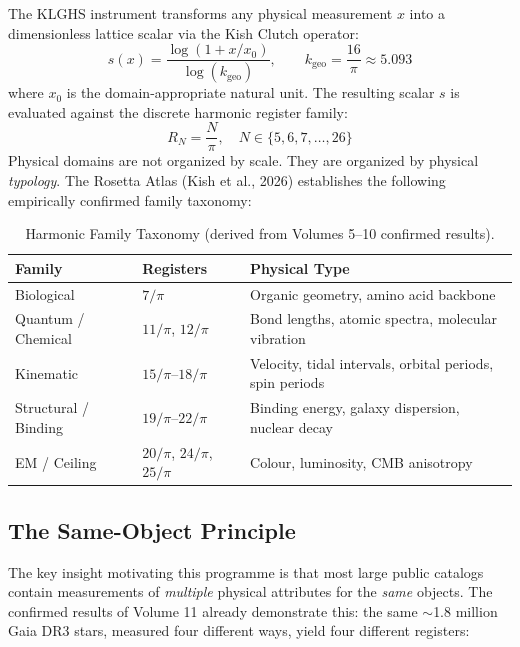 \documentclass[12pt,a4paper]{article}
\newcommand{\kgeo}{\ensuremath{k_{\mathrm{geo}}}}
\begin{document}
The KLGHS instrument transforms any physical measurement $x$ into a
dimensionless lattice scalar via the Kish Clutch operator:
\begin{equation}
  s(x) = \frac{\log(1 + x/x_0)}{\log(\kgeo)},
  \qquad \kgeo = \frac{16}{\pi} \approx 5.093
  \label{eq:kish_clutch}
\end{equation}
where $x_0$ is the domain-appropriate natural unit. The resulting scalar $s$ is
evaluated against the discrete harmonic register family:
\begin{equation}
  R_N = \frac{N}{\pi}, \quad N \in \{5, 6, 7, \ldots, 26\}
\end{equation}
Physical domains are not organized by scale. They are organized by physical
\emph{typology}. The Rosetta Atlas (Kish et al., 2026) establishes the
following empirically confirmed family taxonomy:

\begin{table}[h!]
\centering
\caption{Harmonic Family Taxonomy (derived from Volumes 5--10 confirmed results).}
\label{tab:rosetta_families}
\begin{tabular}{lll}
\toprule
\textbf{Family} & \textbf{Registers} & \textbf{Physical Type} \\
\midrule
Biological & $7/\pi$ & Organic geometry, amino acid backbone \\
Quantum / Chemical & $11/\pi$, $12/\pi$ & Bond lengths, atomic spectra, molecular vibration \\
Kinematic & $15/\pi$--$18/\pi$ & Velocity, tidal intervals, orbital periods, spin periods \\
Structural / Binding & $19/\pi$--$22/\pi$ & Binding energy, galaxy dispersion, nuclear decay \\
EM / Ceiling & $20/\pi$, $24/\pi$, $25/\pi$ & Colour, luminosity, CMB anisotropy \\
\bottomrule
\end{tabular}
\end{table}

\subsection{The Same-Object Principle}

The key insight motivating this programme is that most large public catalogs
contain measurements of \emph{multiple} physical attributes for the
\emph{same} objects. The confirmed results of Volume 11 already demonstrate
this: the same $\sim$1.8 million Gaia DR3 stars, measured four different ways,
yield four different registers:
\end{document}
